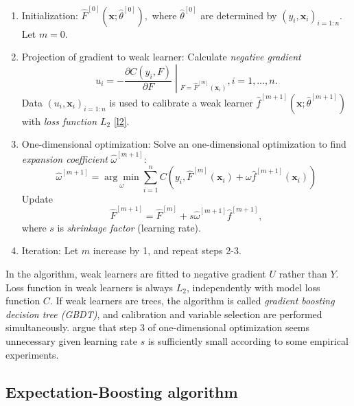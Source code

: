 \documentclass[11pt]{article}
\numberwithin{equation}{section}
\def\bx{\boldsymbol{x}}
\begin{document}
	\begin{enumerate}
		\item Initialization: $\hat{F}^{[0]}(\bx;\hat{\theta}^{[0]}),$ where $\hat{\theta}^{[0]}$ are determined by $(y_i,\bx_i)_{i=1:n}$.
		Let $m=0.$
		\item Projection of gradient to weak learner:
		Calculate \textit{negative gradient} $$u_i=\left.-\frac{\partial C(y_i,F)}{\partial F}\middle|_{F=\hat{F}^{[m]}(\bx_i)}\right., i=1,\ldots,n.$$
		Data $(u_i,\bx_i)_{i=1:n}$ is used to calibrate a weak learner $\hat{f}^{[m+1]}(\bx;\hat{\theta}^{[m+1]})$ with \textit{loss function $L_2$} \eqref{l2}.
	
		\item One-dimensional optimization:
		Solve an one-dimensional optimization  to find \textit{expansion coefficient} $\hat{\omega}^{[m+1]}$:
		$$\hat{\omega}^{[m+1]}=\underset{\omega}{\arg\min}\sum_{i=1}^n C(y_i, \hat{F}^{[m]}(\bx_i)+\omega\hat{f}^{[m+1]}(\bx_i))$$
		Update $$\hat{F}^{[m+1]}=\hat{F}^{[m]}+s\hat{\omega}^{[m+1]}\hat{f}^{[m+1]},$$
		where $s$ is \textit{shrinkage factor} (learning rate).
		\item Iteration: Let $m$ increase by 1, and repeat steps 2-3.
			\end{enumerate}
In the algorithm, weak learners are fitted to negative gradient $U$ rather than $Y$.
		 Loss function in weak learners is always $L_2$, independently with model loss function $C$. 
		 If weak learners are trees, the algorithm is called \textit{gradient boosting decision tree (GBDT)}, and {calibration and variable selection} are performed simultaneously.
		\citet{buhlmann2007boosting} argue that step 3 of one-dimensional optimization seems unnecessary given learning rate $s$ is sufficiently small according to some empirical experiments.




\subsection{Expectation-Boosting algorithm}
\end{document}
